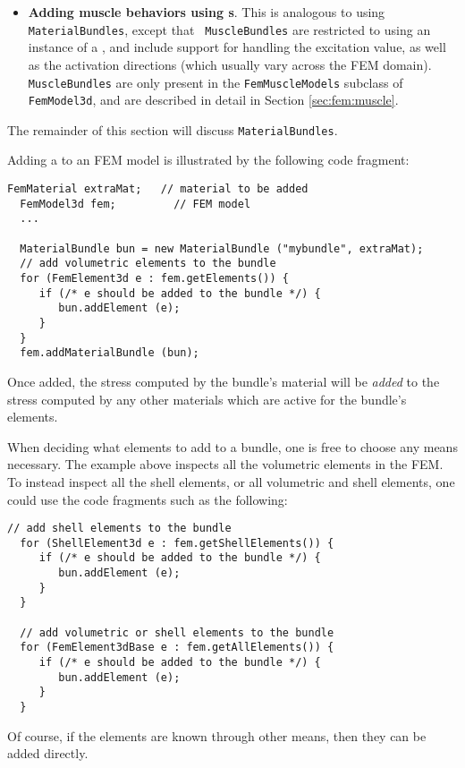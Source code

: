 \begin{itemize}
\item {\bf Adding muscle behaviors using 
s}. This
is analogous to using {\tt MaterialBundles}, except that {\tt
MuscleBundles} are restricted to using an instance of
a , and include
support for handling the excitation value, as well as the activation
directions (which usually vary across the FEM domain). {\tt
MuscleBundles} are only present in the {\tt FemMuscleModels} subclass
of {\tt FemModel3d}, and are described in detail in
Section \ref{sec:fem:muscle}.

\end{itemize}

The remainder of this section will discuss {\tt MaterialBundles}.

Adding a  to
an FEM model is illustrated by the following code fragment:
%
\begin{lstlisting}[]
  FemMaterial extraMat;   // material to be added
  FemModel3d fem;         // FEM model
  ...
  
  MaterialBundle bun = new MaterialBundle ("mybundle", extraMat);
  // add volumetric elements to the bundle
  for (FemElement3d e : fem.getElements()) {
     if (/* e should be added to the bundle */) {
        bun.addElement (e);
     }
  }
  fem.addMaterialBundle (bun);  
\end{lstlisting}
%
Once added, the stress computed by the bundle's material will be {\it
added} to the stress computed by any other materials which are active
for the bundle's elements.

When deciding what elements to add to a bundle, one is free to choose
any means necessary. The example above inspects all the volumetric
elements in the FEM. To instead inspect all the shell elements, or all
volumetric and shell elements, one could use the code
fragments such as the following:
%
\begin{lstlisting}[]
  // add shell elements to the bundle
  for (ShellElement3d e : fem.getShellElements()) {
     if (/* e should be added to the bundle */) {
        bun.addElement (e);
     }
  }

  // add volumetric or shell elements to the bundle
  for (FemElement3dBase e : fem.getAllElements()) {
     if (/* e should be added to the bundle */) {
        bun.addElement (e);
     }
  }
\end{lstlisting}
%
Of course, if the elements are known through other means, then they
can be added directly.

